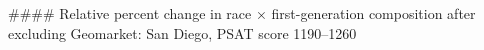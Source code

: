 #### Relative percent change in race × first-generation composition after excluding Geomarket: San Diego, PSAT score 1190–1260
